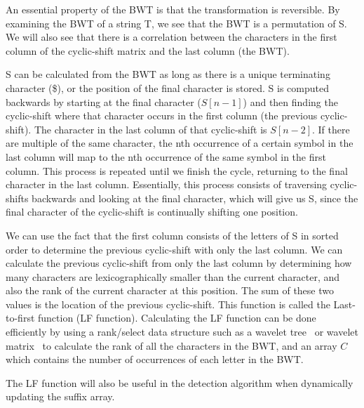 An essential property of the BWT is that the transformation is reversible. By examining
the BWT of a string T, we see that the BWT is a permutation of S. We will also see that
there is a correlation between the characters in the first column of the cyclic-shift
matrix and the last column (the BWT).

S can be calculated from the BWT as long as there is a unique terminating character (\$),
or the position of the final character is stored. S is computed backwards by starting at
the final character ($S[n - 1]$) and then finding the cyclic-shift where that character
occurs in the first column (the previous cyclic-shift). The character in the last column
of that cyclic-shift is $S[n - 2]$. If there are multiple of the same character, the nth
occurrence of a certain symbol in the last column will map to the nth occurrence of the
same symbol in the first column. This process is repeated until we finish the cycle,
returning to the final character in the last column. Essentially, this process consists of
traversing cyclic-shifts backwards and looking at the final character, which will give us
S, since the final character of the cyclic-shift is continually shifting one position.

We can use the fact that the first column consists of the letters of S in sorted order to
determine the previous cyclic-shift with only the last column. We can calculate the
previous cyclic-shift from only the last column by determining how many characters are
lexicographically smaller than the current character, and also the rank of the current
character at this position. The sum of these two values is the location of the previous
cyclic-shift. This function is called the Last-to-first function (LF function).
Calculating the LF function can be done efficiently by using a rank/select data structure
such as a wavelet tree~\cite{WaveletTree} or wavelet matrix~\cite{WaveletMatrix} to
calculate the rank of all the characters in the BWT, and an array $C$ which contains the
number of occurrences of each letter in the BWT.

The LF function will also be useful in the detection algorithm when dynamically updating
the suffix array.
